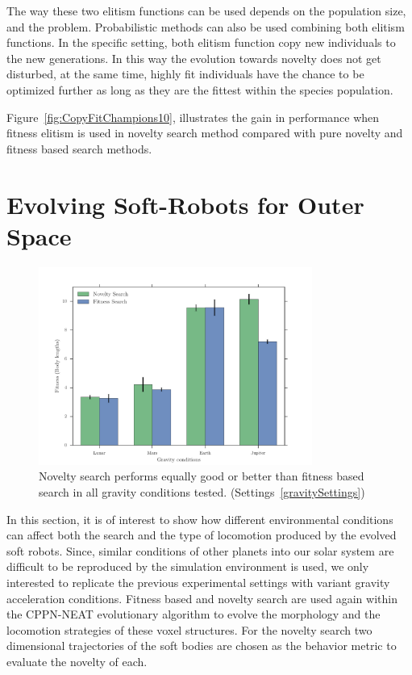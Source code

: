 The way these two elitism functions can be used depends on the population size, and the problem. Probabilistic methods can also be used combining both elitism functions. In the specific setting, both elitism function copy new individuals to the new generations. In this way the evolution towards novelty does not get disturbed, at the same time, highly fit individuals have the chance to be optimized further as long as they are the fittest within the species population.

Figure~\ref{fig:CopyFitChampions10}, illustrates the gain in performance when fitness elitism is used in novelty search method compared with pure novelty and fitness based search methods.
















\clearpage

\section{Evolving Soft-Robots for Outer Space}  

\begin{figure}[t!]
\centering
\includegraphics[width=0.8\textwidth]{../Figures/Results/GravityExperiment.pdf}
\caption{Novelty search performs equally good or better than fitness based search in all gravity conditions tested. (Settings~\ref{gravitySettings})}
\label{fig:gravityConditions}
\end{figure}

In this section, it is of interest to show how different environmental conditions can affect both the search and the type of locomotion produced by the evolved soft robots. Since, similar conditions of other planets into our solar system are difficult to be reproduced by the simulation environment is used, we only interested to replicate the previous experimental settings with variant gravity acceleration conditions. Fitness based and novelty search are used again within the CPPN-NEAT evolutionary algorithm to evolve the morphology and the locomotion strategies of these voxel structures. For the novelty search two dimensional trajectories of the soft bodies are chosen as the behavior metric to evaluate the novelty of each. 

